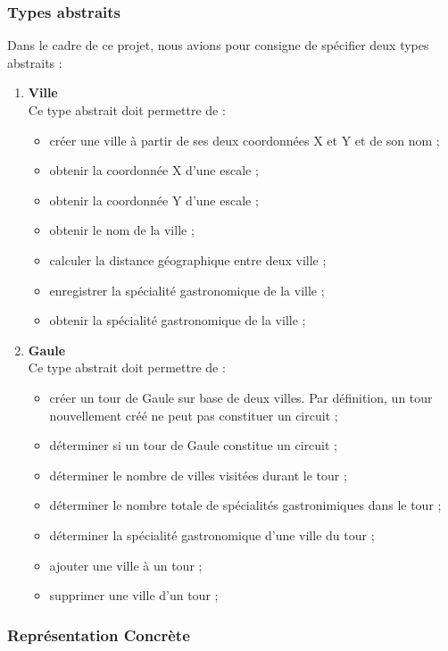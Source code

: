 \documentclass[a4paper, 11pt, oneside]{article}
\begin{document}
\subsubsection{Types abstraits}
Dans le cadre de ce projet, nous avions pour consigne de spécifier deux types abstraits : 
\begin{enumerate}
    \item \textbf{Ville} \\
    Ce type abstrait doit permettre de :
    \begin{itemize}
        \item créer une ville à partir de ses deux coordonnées X et Y et de son nom ;
        \item obtenir la coordonnée X d’une escale ;
        \item obtenir la coordonnée Y d’une escale ;
        \item obtenir le nom de la ville ;
        \item calculer la distance géographique entre deux ville ;
        \item enregistrer la spécialité gastronomique de la ville ;
        \item obtenir la spécialité gastronomique de la ville ;
    \end{itemize}
    \item \textbf{Gaule}\\
    Ce type abstrait doit permettre de :
    \begin{itemize}
        \item créer un tour de Gaule sur base de deux villes. Par définition, un tour 
        nouvellement créé ne peut pas constituer un circuit ;
        \item déterminer si un tour de Gaule constitue un circuit ;
        \item déterminer le nombre de villes visitées durant le tour ;
        \item déterminer le nombre totale de spécialités gastronimiques dans le tour ;
        \item déterminer la spécialité gastronomique d’une ville du tour ;
        \item ajouter une ville à un tour ;
        \item supprimer une ville d’un tour ;
    \end{itemize}
\end{enumerate}

\subsubsection{Représentation Concrète}
\end{document}

